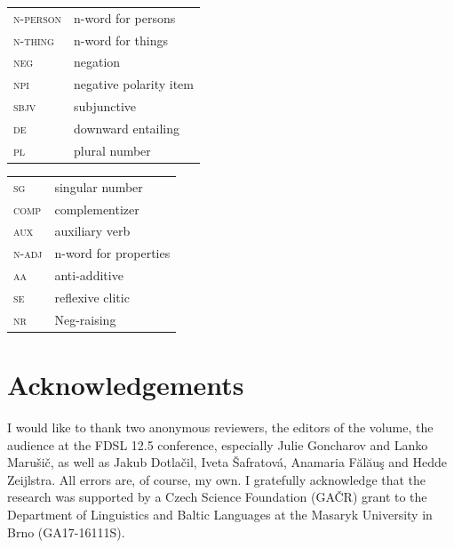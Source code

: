 \documentclass[output=paper,
]{langscibook}
\begin{document}
\begin{tabularx}{.5\textwidth}{@{}lX@{}}
\textsc{n-person}&{n-word for persons}\\
\textsc{n-thing}&n-word for things\\
\textsc{neg}&negation\\
\textsc{npi}&{negative polarity item}\\
\textsc{sbjv}&subjunctive\\
\textsc{de}&{downward entailing}\\
\textsc{pl}&{plural number}\\
\end{tabularx}%
\begin{tabularx}{.5\textwidth}{@{}lX@{}}
\textsc{sg}&{singular number}\\
\textsc{comp}&complementizer\\
\textsc{aux}&{auxiliary verb}\\
\textsc{n-adj}&{n-word for properties}\\
\textsc{aa}&{anti-additive  }\\
\textsc{se}&{reflexive clitic}\\
\textsc{nr}&Neg-raising\\
\end{tabularx}


\section*{Acknowledgements}

I would like to thank two anonymous reviewers, the editors of the volume, the audience at the FDSL 12.5 conference, especially Julie Goncharov and Lanko Marušič, as well as  Jakub Dotlačil, Iveta Šafratová, Anamaria Fălăuş and Hedde Zeijlstra. All errors are, of course, my own. I gratefully acknowledge that the research was supported by a Czech Science Foundation (GAČR) grant to the Department of Linguistics and Baltic Languages at the Masaryk University in Brno (GA17-16111S).

\sloppy
\printbibliography[heading=subbibliography,notkeyword=this]
\end{document}
